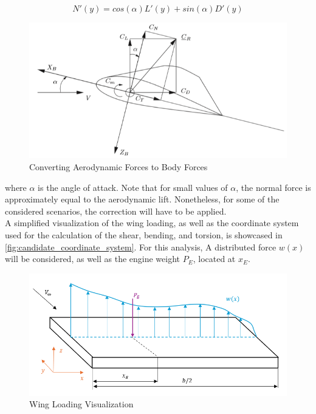 \begin{equation}    \label{eq:forces_normal_transformation}
    N'(y)=cos(\alpha)L'(y)+sin(\alpha)D'(y)
\end{equation}

\begin{figure}[H]
    \centering
    \includegraphics[width=0.5\linewidth]{figures/coordinates_converting_forces.png}
    \caption{Converting Aerodynamic Forces to Body Forces \cite{Timmer2024AE2111-IReader}}
    \label{fig:forces_coordinate_transformation}
\end{figure}


\noindent where $\alpha$ is the angle of attack. Note that for small values of $\alpha$, the normal force is approximately equal to the aerodynamic lift. Nonetheless, for some of the considered scenarios, the correction will have to be applied.\\

\noindent A simplified visualization of the wing loading, as well as the coordinate system used for the calculation of the shear, bending, and torsion, is showcased in \autoref{fig:candidate_coordinate_system}. For this analysis, A distributed force $w(x)$ will be considered, as well as the engine weight $P_E$, located at $x_E$.

\begin{figure}[H]
    \centering
    \includegraphics[width=0.75\linewidth]{figures/beam_loading_no_moment.png}
    \caption{Wing Loading Visualization}
    \label{fig:candidate_coordinate_system}
\end{figure}


